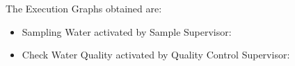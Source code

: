 \newpage

The Execution Graphs obtained are:

\begin{itemize}
\item Sampling Water activated by Sample Supervisor:
	\bigskip
	\bigskip
	\begin{center}
	\end{center}
	\bigskip
\newpage
\item Check Water Quality activated by Quality Control Supervisor:
	\bigskip
	\bigskip
	\bigskip
	\bigskip
	\begin{center}
	\end{center}
	\bigskip
\end{itemize}



